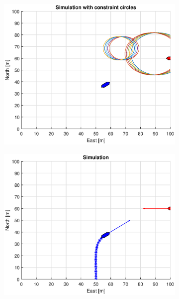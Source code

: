 \begin{figure}[!b]
\begin{subfigure}[b]{0.499\textwidth}
    \end{subfigure}
    \hfill
    \\
    \begin{subfigure}[b]{0.49\textwidth}
        \centering
        \includegraphics[width=\textwidth]{Images/Figures/Enkel_GW/Simple0_f1_Frame3}
    \end{subfigure}
    \hfill
    \begin{subfigure}[b]{0.499\textwidth}
        \centering
        \includegraphics[width=\textwidth]{Images/Figures/Enkel_GW/Simple0_f600_Frame3}
    \end{subfigure}
    \hfill
\end{figure}%
